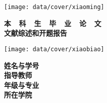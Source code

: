 
\thispagestyle{empty}

{
\setlength{\parindent}{0em}
\renewcommand{\baselinestretch}{2}

\vspace*{-7mm}

\begin{center}
  \texttt{[image: data/cover/xiaoming]}
\end{center}

\vspace{-1mm}

{
\renewcommand{\baselinestretch}{1.8}
\heiti\erhao\bfseries
\centering
本~~科~~生~~毕~~业~~论~~文 \\
文献综述和开题报告 \par
}

\vspace{4em}

\begin{center}
  \texttt{[image: data/cover/xiaobiao]}
\end{center}

\vspace{3em}
\def\zjuu[#1]#2{%
  \underline{\hbox to #1{\hfill#2\hfil}}}

{
	\renewcommand{\baselinestretch}{1.65}
	\sanhao
	\centering
	{\kaiti\bfseries 姓名与学号} \; \underline{\makebox[13em]{\songti\zjuauthornamec~~\zjuauthorid}} \\ \vspace{0.9em}
	{\kaiti\bfseries 指导教师} \; \underline{\makebox[14em]{\songti\zjumentorc}} \\ \vspace{0.9em}
	{\kaiti\bfseries 年级与专业} \; \underline{\makebox[13em]{\songti\zjugrade~~\zjumajor}} \\ \vspace{0.9em}
	{\kaiti\bfseries 所在学院} \; \underline{\makebox[14em]{\songti\zjucollegec}} \par
}


}

